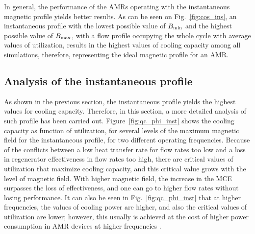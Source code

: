 \documentclass[draft]{svjour3}
\newcommand{\bmax}{\ensuremath{{B}\ped{max}}}
\newcommand{\bmin}{\ensuremath{{B}\ped{min}}}
\begin{document}
In general, the performance of the AMRs operating with the instantaneous magnetic profile yields better results. As can be seen on Fig.~\ref{fig:cos_ins}, an instantaneous profile with the lowest possible value of $\bmin$ and the highest possible value of $\bmax$, with a flow profile occupying the whole cycle with average values of utilization, results in the highest values of cooling capacity among all simulations, therefore, representing the ideal magnetic profile for an AMR.

\subsection{Analysis of the instantaneous profile}
\label{sec:deta-analys-inst}

As shown in the previous section, the instantaneous profile yields the highest values for cooling capacity. Therefore, in this section, a more detailed analysis of such profile has been carried out. Figure~\ref{fig:qc_phi_inst} shows the cooling capacity as function of utilization, for several levels of the maximum magnetic field for the instantaneous profile, for two different operating frequencies. Because of the conflicts between a low heat transfer rate for flow rates too low and a loss in regenerator effectiveness in flow rates too high, there are critical values of utilization that maximize cooling capacity, and this critical value grows with the level of magnetic field. With higher magnetic field, the increase in the MCE surpasses the loss of effectiveness, and one can go to higher flow rates without losing performance. It can also be seen in Fig.~\ref{fig:qc_phi_inst} that at higher frequencies, the values of cooling power are higher, and also the critical values of utilization are lower; however, this usually is achieved at the cost of higher power consumption in AMR devices at higher frequencies \cite{bib:lei15_study,NIKNIA2016601}.
\end{document}
